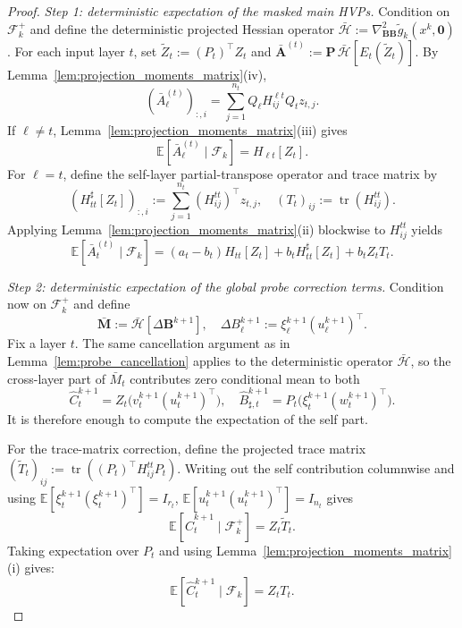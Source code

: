 \documentclass{pkumelon}
\theoremstyle{plain}
\newcommand{\E}{\mathbb{E}}
\DeclareMathOperator{\tr}{tr}
\begin{document}
\begin{proof}
\emph{Step 1: deterministic expectation of the masked main HVPs.} Condition on $\mathcal F_k^+$ and define the deterministic projected Hessian operator $\bar{\mathcal H}:=\nabla_{\boldsymbol B\boldsymbol B}^2\tilde g_k(x^k,\mathbf 0)$. For each input layer $t$, set $\tilde Z_t:=(P_t)^\top Z_t$ and $\bar{\boldsymbol A}^{(t)}:=\boldsymbol P\,\bar{\mathcal H}[E_t(\tilde Z_t)]$. By Lemma~\ref{lem:projection_moments_matrix}(iv),
\begin{equation*}
(\bar A_\ell^{(t)})_{:,i} = \sum_{j=1}^{n_t}Q_\ell H_{ij}^{\ell t}Q_t z_{t,j}.
\end{equation*}
If $\ell\neq t$, Lemma~\ref{lem:projection_moments_matrix}(iii) gives
\begin{equation*}
\E[\bar A_\ell^{(t)}\mid \mathcal F_k] = H_{\ell t}[Z_t].
\end{equation*}
For $\ell=t$, define the self-layer partial-transpose operator and trace matrix by
\begin{equation*}
(H_{tt}^\sharp[Z_t])_{:,i} := \sum_{j=1}^{n_t}(H_{ij}^{tt})^\top z_{t,j}, \quad (T_t)_{ij}:=\tr(H_{ij}^{tt}).
\end{equation*}
Applying Lemma~\ref{lem:projection_moments_matrix}(ii) blockwise to $H_{ij}^{tt}$ yields
\begin{equation}\label{eq:self_main_expectation_active}
\E[\bar A_t^{(t)}\mid \mathcal F_k]
=
(a_t-b_t)H_{tt}[Z_t]
+b_t H_{tt}^\sharp[Z_t]
+b_t Z_t T_t.
\end{equation}

\emph{Step 2: deterministic expectation of the global probe correction terms.} Condition now on $\mathcal F_k^+$ and define
\begin{equation*}
\bar{\boldsymbol M}:=\bar{\mathcal H}[\Delta\boldsymbol B^{k+1}], \quad \Delta B_\ell^{k+1}:=\xi_\ell^{k+1}(u_\ell^{k+1})^\top.
\end{equation*}
Fix a layer $t$. The same cancellation argument as in Lemma~\ref{lem:probe_cancellation} applies to the deterministic operator $\bar{\mathcal H}$, so the cross-layer part of $\bar M_t$ contributes zero conditional mean to both
\begin{equation*}
\widehat C_t^{k+1} = Z_t\bigl(v_t^{k+1}(u_t^{k+1})^\top\bigr), \quad \widehat B_{\sharp,t}^{k+1} = P_t\bigl(\xi_t^{k+1}(w_t^{k+1})^\top\bigr).
\end{equation*}
It is therefore enough to compute the expectation of the self part.

For the trace-matrix correction, define the projected trace matrix $(\tilde T_t)_{ij}:=\tr\!\left((P_t)^\top H_{ij}^{tt}P_t\right)$. Writing out the self contribution columnwise and using $\E[\xi_t^{k+1}(\xi_t^{k+1})^\top]=I_{r_t}$, $\E[u_t^{k+1}(u_t^{k+1})^\top]=I_{n_t}$ gives
\begin{equation}\label{eq:ECt_given_P_active}
\E[\widehat C_t^{k+1}\mid \mathcal F_k^+]=Z_t\tilde T_t.
\end{equation}
Taking expectation over $P_t$ and using Lemma~\ref{lem:projection_moments_matrix}(i) gives:
\begin{equation}\label{eq:ECt_total_active}
\E[\widehat C_t^{k+1}\mid \mathcal F_k]=Z_tT_t.
\end{equation}


\end{proof}
\end{document}
